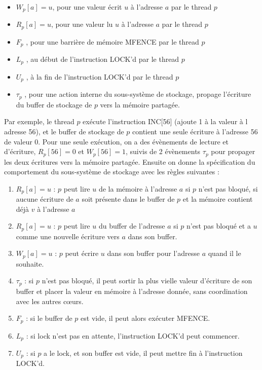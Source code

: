 \documentclass[12pt,a4paper]{article}
\begin{document}
\begin{itemize}
	\item $W_p[a]=u$, pour une valeur écrit $u$ à l'adresse $a$ par le thread $p$	
	\item $R_p[a]=u$, pour une valeur lu $u$ à l'adresse $a$ par le thread $p$
	\item $F_p$ , pour une barrière de mémoire MFENCE par le thread $p$
	\item $L_p$ , au début de l'instruction LOCK'd par le thread $p$
	\item $U_p$ , à la fin de l'instruction LOCK'd par le thread $p$
	\item $\tau_p$ , pour une action interne du sous-système de stockage, propage l'écriture du buffer de stockage de $p$ vers la mémoire partagée.
\end{itemize}

Par exemple, le thread $p$ exécute l'instruction INC[56] (ajoute 1 à la valeur à l adresse 56), et le buffer de stockage de $p$ contient une seule écriture à l'adresse 56 de valeur 0. Pour une seule exécution, on a des évènements de lecture et d'écriture, $R_p[56] = 0$ et $W_p[56] = 1$, suivis de 2 évènements $\tau_p$ pour propager les deux écritures vers la mémoire partagée.
Ensuite on donne la spécification du comportement du sous-système de stockage avec les règles suivantes :
\begin{enumerate}
	\item $R_p[a] = u$ : $p$ peut lire $u$ de la mémoire à l'adresse $a$ si $p$ n'est pas bloqué, si aucune écriture de $a$ soit présente dans le buffer de $p$ et la mémoire contient déjà $v$ à l'adresse $a$
	\item $R_p[a] = u$ : $p$ peut lire $u$ du buffer de l'adresse $a$ si $p$ n'est pas bloqué et a $u$ comme une nouvelle écriture vers $a$ dans son buffer.
	\item $W_p[a] = u$ : $p$ peut écrire $u$ dans son buffer pour l'adresse $a$ quand il le souhaite.
	\item $\tau_p$ : si $p$ n'est pas bloqué, il peut sortir la plus vielle valeur d'écriture de son buffer et placer la valeur en mémoire à l'adresse donnée, sans coordination avec les autres cœurs.
	\item $F_p$ : si le buffer de $p$ est vide, il peut alors exécuter MFENCE.
	\item $L_p$ : si lock n'est pas en attente, l'instruction LOCK'd peut commencer.
	\item $U_p$ : si $p$ a le lock, et son buffer est vide, il peut mettre fin à l'instruction LOCK'd.
\end{enumerate}
\end{document}
